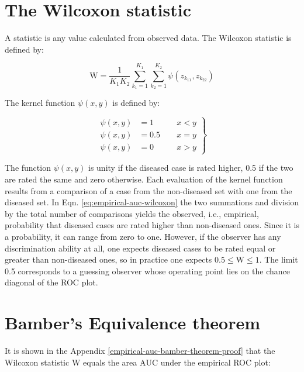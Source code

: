 \documentclass[
]{book}
\begin{document}
\hypertarget{empirical-auc-wilcoxon}{%
\section{The Wilcoxon statistic}\label{empirical-auc-wilcoxon}}

A statistic is any value calculated from observed data. The Wilcoxon statistic is defined by:

\begin{equation}
\text{W}=\frac{1}{K_1K_2} \sum_{k_1=1}^{K_1} \sum_{k_2=1}^{K_2} \psi\left ( z_{k_11} ,  z_{k_22} \right )
\label{eq:empirical-auc-wilcoxon}
\end{equation}

The kernel function \(\psi\left ( x, y \right )\) is defined by:

\begin{equation}
\left.
\begin{aligned}
\psi(x,y)&=1  \qquad & x<y \\
\psi(x,y)&=0.5  & x=y \\
\psi(x,y)&=0  & x>y
\end{aligned}
\right \}
\label{eq:empirical-auc-psi}
\end{equation}

The function \(\psi\left ( x, y \right )\) is unity if the diseased case is rated higher, 0.5 if the two are rated the same and zero otherwise. Each evaluation of the kernel function results from a comparison of a case from the non-diseased set with one from the diseased set. In Eqn. \eqref{eq:empirical-auc-wilcoxon} the two summations and division by the total number of comparisons yields the observed, i.e., empirical, probability that diseased cases are rated higher than non-diseased ones. Since it is a probability, it can range from zero to one. However, if the observer has any discrimination ability at all, one expects diseased cases to be rated equal or greater than non-diseased ones, so in practice one expects \(0.5 \leq \text{W} \leq 1\). The limit 0.5 corresponds to a guessing observer whose operating point lies on the chance diagonal of the ROC plot.

\hypertarget{empirical-auc-wilcoxon-bamber-theorem}{%
\section{Bamber's Equivalence theorem}\label{empirical-auc-wilcoxon-bamber-theorem}}

It is shown in the Appendix \ref{empirical-auc-bamber-theorem-proof} that the Wilcoxon statistic \(\text{W}\) equals the area \(\text{AUC}\) under the empirical ROC plot:
\end{document}
